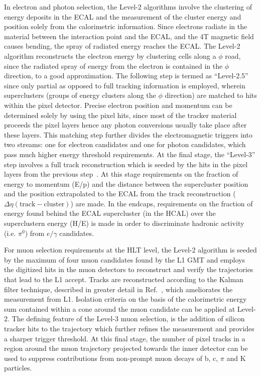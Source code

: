 In electron and photon selection, the Level-2 algorithms involve the clustering of energy deposits in the ECAL and the measurement of the cluster energy and position solely from the calorimetric information. Since electrons radiate in the material between the interaction point and the ECAL, and the 4T magnetic field causes bending, the spray of radiated energy reaches the ECAL. The Level-2 algorithm reconstructs the electron energy by clustering cells along a $\phi$ road, since the radiated spray of energy from the electron is contained in the $\phi$ direction, to a good approximation. The following step is termed as ``Level-2.5'' since only partial as opposed to full tracking information is employed, wherein superclusters (groups of energy clusters along the $\phi$ direction) are matched to hits within the pixel detector. Precise electron position and momentum can be determined solely by using the pixel hits, since most of the tracker material proceeds the pixel layers hence any photon conversions usually take place after these layers. This matching step further divides the electromagnetic triggers into two streams: one for electron candidates and one for photon candidates, which pass much higher energy threshold requirements. At the final stage, the ``Level-3'' step involves a full track reconstruction which is seeded by the hits in the pixel layers from the previous step~\cite{}. At this stage requirements on the fraction of energy to momentum (E/p) and the distance between the supercluster position and the position extrapolated to the ECAL from the track reconstruction ($\Delta\eta\mathrm{(track-cluster)}$) are made. In the endcaps, requirements on the fraction of energy found behind the ECAL supercluster (in the HCAL) over the superclustern energy (H/E) is made in order to discriminate hadronic activity (i.e. $\pi^{0}$) from $e/\gamma$ candidates. 

For muon selection requirements at the HLT level, the Level-2 algorithm is seeded by the maximum of four muon candidates found by the L1 GMT and employs the digitized hits in the muon detectors to reconstruct and verify the trajectories that lead to the L1 accept. Tracks are reconstructed according to the Kalman filter technique, described in greater detail in Ref.~\cite{Fruhwirth:1987fm}, which ameliorates the \pt measurement from L1. Isolation criteria on the basis of the calorimetric energy sum contained within a cone around the muon candidate can be applied at Level-2. The defining feature of the Level-3 muon selection, is the addition of silicon tracker hits to the trajectory which further refines the \pt measurement and provides a sharper trigger threshold. At this final stage, the number of pixel tracks in a region around the muon trajectory projected towards the inner detector can be used to suppress contributions from non-prompt muon decays of b, c, $\pi$ and K particles.

